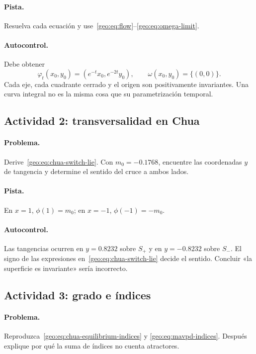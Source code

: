 \paragraph{Pista.}
Resuelva cada ecuación y use~\eqref{geo:eq:flow}--\eqref{geo:eq:omega-limit}.

\paragraph{Autocontrol.}
Debe obtener
\begin{equation}
 \varphi_t(x_0,y_0)=(e^{-t}x_0,e^{-2t}y_0),\qquad
 \omega(x_0,y_0)=\{(0,0)\}.
\end{equation}
Cada eje, cada cuadrante cerrado y el origen son positivamente invariantes.
Una curva integral no es la misma cosa que su parametrización temporal.

\subsection{Actividad 2: transversalidad en Chua}

\paragraph{Problema.}
Derive~\eqref{geo:eq:chua-switch-lie}. Con \(m_0=-0.1768\), encuentre las
coordenadas \(y\) de tangencia y determine el sentido del cruce a ambos lados.

\paragraph{Pista.}
En \(x=1\), \(\phi(1)=m_0\); en \(x=-1\), \(\phi(-1)=-m_0\).

\paragraph{Autocontrol.}
Las tangencias ocurren en \(y=0.8232\) sobre \(S_+\) y en \(y=-0.8232\)
sobre \(S_-\). El signo de las expresiones en~\eqref{geo:eq:chua-switch-lie}
decide el sentido. Concluir «la superficie es invariante» sería incorrecto.

\subsection{Actividad 3: grado e índices}

\paragraph{Problema.}
Reproduzca~\eqref{geo:eq:chua-equilibrium-indices} y
\eqref{geo:eq:mavpd-indices}. Después explique por qué la suma de índices no
cuenta atractores.


